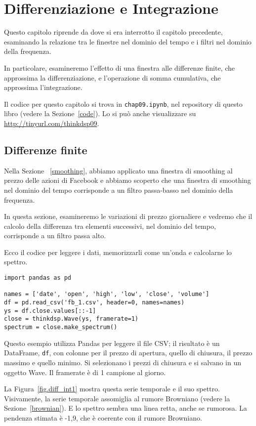 \documentclass[12pt]{book} \usepackage[width=5.5in,height=8.5in, hmarginratio=3:2,vmarginratio=1:1]{geometry}
\begin{document}
\chapter{Differenziazione e Integrazione} \label{diffint} 

Questo capitolo riprende da dove si era interrotto il capitolo precedente, esaminando la relazione tra le finestre nel dominio del tempo e i filtri nel dominio della frequenza.

In particolare, esamineremo l'effetto di una finestra alle differenze finite, che approssima la differenziazione, e l'operazione di somma cumulativa, che approssima l'integrazione.

Il codice per questo capitolo si trova in {\tt chap09.ipynb}, nel repository di questo libro (vedere la Sezione~\ref{code}). Lo si può anche visualizzare su \url{http://tinyurl.com/thinkdsp09}.

\section{Differenze finite} \label{diffs} 

Nella Sezione ~\ref{smoothing}, abbiamo applicato una finestra di smoothing al prezzo delle azioni di Facebook e abbiamo scoperto che una finestra di smoothing nel dominio del tempo corrisponde a un filtro passa-basso nel dominio della frequenza.

In questa sezione, esamineremo le variazioni di prezzo giornaliere e vedremo che il calcolo della differenza tra elementi successivi, nel dominio del tempo, corrisponde a un filtro passa alto.

Ecco il codice per leggere i dati, memorizzarli come un'onda e calcolarne lo spettro.

\begin{verbatim} 
import pandas as pd

names = ['date', 'open', 'high', 'low', 'close', 'volume']
df = pd.read_csv('fb_1.csv', header=0, names=names)
ys = df.close.values[::-1]
close = thinkdsp.Wave(ys, framerate=1)
spectrum = close.make_spectrum()
 \end{verbatim} 

Questo esempio utilizza Pandas per leggere il file CSV; il risultato è un DataFrame, {\tt df}, con colonne per il prezzo di apertura, quello di chiusura, il prezzo massimo e quello minimo. Si selezionano i prezzi di chiusura e si salvano in un oggetto Wave. Il framerate è di 1 campione al giorno.

La Figura~\ref{fig.diff_int1} mostra questa serie temporale e il suo spettro. Visivamente, la serie temporale assomiglia al rumore Browniano (vedere la Sezione~\ref{brownian}). E lo spettro sembra una linea retta, anche se rumorosa. La pendenza stimata è -1,9, che è coerente con il rumore Browniano.
\end{document}
